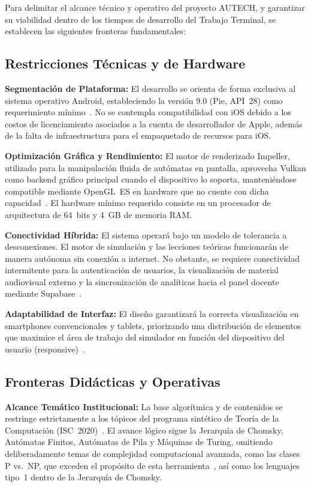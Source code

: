 Para delimitar el alcance técnico y operativo del proyecto AUTECH, y garantizar su viabilidad
dentro de los tiempos de desarrollo del Trabajo Terminal, se establecen las siguientes
fronteras fundamentales:

\subsection{Restricciones Técnicas y de Hardware}
\label{ssec:restricciones_tecnicas}

\textbf{Segmentación de Plataforma:} El desarrollo se orienta de forma exclusiva al sistema
operativo Android, estableciendo la versión 9.0 (Pie, API~28) como requerimiento
mínimo~\cite{google2023android}. No se contempla compatibilidad con iOS debido a los costos
de licenciamiento asociados a la cuenta de desarrollador de Apple, además de la falta de
infraestructura para el empaquetado de recursos para iOS.

\textbf{Optimización Gráfica y Rendimiento:} El motor de renderizado Impeller, utilizado para
la manipulación fluida de autómatas en pantalla, aprovecha Vulkan como backend gráfico
principal cuando el dispositivo lo soporta, manteniéndose compatible mediante OpenGL~ES en
hardware que no cuente con dicha capacidad~\cite{flutter2024a}. El hardware mínimo requerido
consiste en un procesador de arquitectura de 64~bits y 4~GB de memoria RAM.

\textbf{Conectividad Híbrida:} El sistema operará bajo un modelo de tolerancia a
desconexiones. El motor de simulación y las lecciones teóricas funcionarán de manera autónoma
sin conexión a internet. No obstante, se requiere conectividad intermitente para la
autenticación de usuarios, la visualización de material audiovisual externo y la
sincronización de analíticas hacia el panel docente mediante Supabase~\cite{supabase2024}.

\textbf{Adaptabilidad de Interfaz:} El diseño garantizará la correcta visualización en
smartphones convencionales y tablets, priorizando una distribución de elementos que maximice
el área de trabajo del simulador en función del dispositivo del usuario
(responsive)~\cite{materialdesign2023}.

\subsection{Fronteras Didácticas y Operativas}
\label{ssec:fronteras_didacticas}

\textbf{Alcance Temático Institucional:} La base algorítmica y de contenidos se restringe
estrictamente a los tópicos del programa sintético de Teoría de la Computación
(ISC~2020)~\cite{ipn2020}. El avance lógico sigue la Jerarquía de Chomsky, Autómatas Finitos,
Autómatas de Pila y Máquinas de Turing, omitiendo deliberadamente temas de complejidad
computacional avanzada, como las clases P vs.\ NP, que exceden el propósito de esta
herramienta~\cite{hopcroft2007}, así como los lenguajes tipo~1 dentro de la Jerarquía de
Chomsky.


